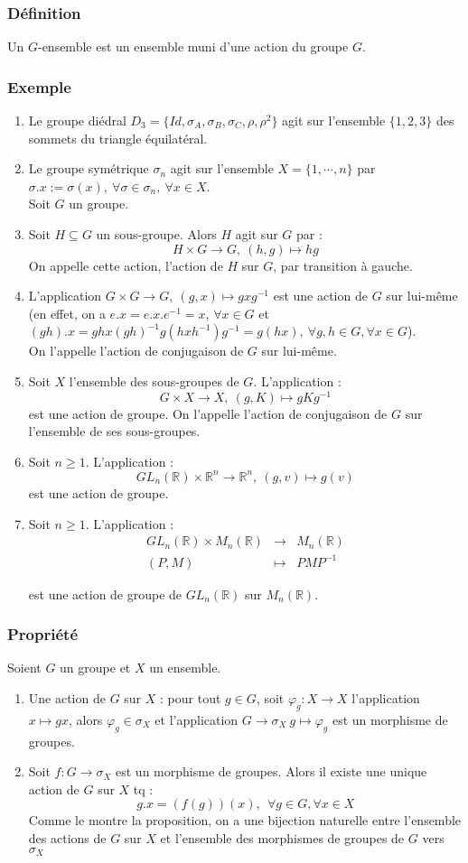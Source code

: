 \documentclass[a4paper, oneside]{report}
\newcommand{\x}{\times}
\newcommand{\R}{\mathbb{R}}
\newcommand{\propr}{\subsubsection{Propriété}}
\newcommand{\exem}{\subsubsection{Exemple}}
\begin{document}
\subsubsection{Définition}
Un $G$-ensemble est un ensemble muni d'une action du groupe $G$.

\exem
\begin{enumerate}
\item Le groupe diédral $D_3=\{Id, \sigma_A, \sigma_B, \sigma_C, \rho, \rho^2\}$ agit sur l'ensemble $\{1,2,3\}$ des sommets du triangle équilatéral.
\item Le groupe symétrique $\sigma_n$ agit sur l'ensemble $X=\{1,\cdots,n\}$ par $\sigma.x := \sigma(x), ~\forall \sigma \in \sigma_n,~\forall x\in X$.\\

Soit $G$ un groupe.
\item Soit $H\subseteq G$ un sous-groupe. Alors $H$ agit sur $G$ par :
$$H\x G \rightarrow G,~ (h,g)\mapsto hg$$
On appelle cette action, l'action de $H$ sur $G$, par transition à gauche.
\item L'application $G\x G \rightarrow G,~ (g,x) \mapsto gxg^{-1}$ est une action de $G$ sur lui-même (en effet, on a $e.x = e.x.e^{-1} =x$, $\forall x\in G$ et $(gh).x=ghx(gh)^{-1}g(hxh^{-1})g^{-1}=g(hx),~\forall g,h\in G, \forall x\in G$).\\
On l'appelle l'action de conjugaison de $G$ sur lui-même.
\item Soit $X$ l'ensemble des sous-groupes de $G$. L'application :
$$G\x X \rightarrow X,~(g,K)\mapsto gKg^{-1}$$
est une action de groupe. On l'appelle l'action de conjugaison de $G$ sur l'ensemble de ses sous-groupes.
\item Soit $n\geq 1$. L'application :
$$GL_n(\R)\x \R^n \rightarrow \R^n,~(g,v)\mapsto g(v)$$
est une action de groupe.
\item Soit $n\geq 1$. L'application :
$$\begin{array}{lll}
GL_n(\R)\x M_n(\R)&\rightarrow & M_n(\R)\\
(P,M)&\mapsto & PMP^{-1}
\end{array}$$

est une action de groupe de $GL_n(\R)$ sur $M_n(\R)$.
\end{enumerate}

\propr
Soient $G$ un groupe et $X$ un ensemble.
\begin{enumerate}
\item Une action de $G$ sur $X$ : pour tout $g\in G$, soit $\varphi_g :X \rightarrow X$ l'application $x\mapsto gx$, alors $\varphi_g \in \sigma_X$ et l'application $G\rightarrow \sigma_X~g\mapsto \varphi_g$ est un morphisme de groupes.
\item Soit $f:G\rightarrow \sigma_X$ est un morphisme de groupes. Alors il existe une unique action de $G$ sur $X$ tq :
$$g.x = (f(g))(x),~~\forall g\in G,\forall x\in X$$
Comme le montre la proposition, on a une bijection naturelle entre l'ensemble des actions de $G$ sur $X$ et l'ensemble des morphismes de groupes de $G$ vers $\sigma_X$
\end{enumerate}
\end{document}
